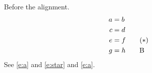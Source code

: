 \documentclass[10pt]{article}
\begin{document}
Before the alignment.
\begin{align}
 a &= b \label{e:a}\\
 c &= d \notag\\
 e &= f \tag{$*$}\label{e:star}\\
 g &= h \tag*{B}
\end{align}
See \eqref{e:a} and \eqref{e:star} and \ref{e:a}.
\end{document}
